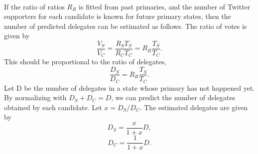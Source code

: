 \documentclass[12pt]{extarticle}
\begin{document}
\\
\indent
If the ratio of ratios $R_R$ is fitted from past primaries, and the number of Twitter supporters for each candidate is known for future primary states, then the number of predicted delegates can be estimated as follows.
The ratio of votes is given by
\begin{equation}
\frac{V_S}{V_C} = \frac{R_S T_S}{R_C T_C} = R_R \frac{T_S}{T_C}.
\end{equation}
This should be proportional to the ratio of delegates,
\begin{equation}
\frac{D_S}{D_C} = R_R \frac{T_S}{T_C}.
\end{equation}
Let D be the number of delegates in a state whose primary has not happened yet.
By normalizing with $D_S + D_C = D$, we can predict the number of delegates obtained by each candidate.
Let $x = D_S / D_C$.
The estimated delegates are given by
\begin{equation}
	\label{eq:ds}
D_S = \frac{x}{1+x} D,
\end{equation}
\begin{equation}
	\label{eq:dc}
D_C = \frac{1}{1+x} D.
\end{equation}
\end{document}
